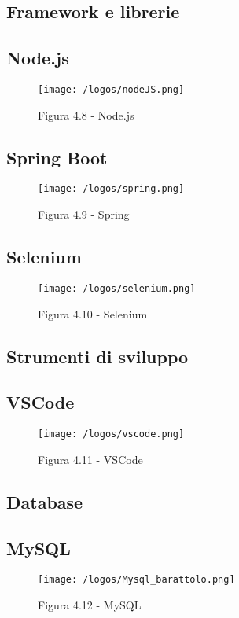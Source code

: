 \subsection{Framework e librerie}
\subsection*{Node.js}
\begin{figure}[H] 
    \centering 
    \texttt{[image: /logos/nodeJS.png]} 
    \caption{Figura 4.8 - Node.js}
\end{figure}


\subsection*{Spring Boot}
\begin{figure}[H] 
    \centering 
    \texttt{[image: /logos/spring.png]} 
    \caption{Figura 4.9 - Spring}
\end{figure}


\subsection*{Selenium}
\begin{figure}[H] 
    \centering 
    \texttt{[image: /logos/selenium.png]} 
    \caption{Figura 4.10 - Selenium}
\end{figure}


\subsection{Strumenti di sviluppo}
\subsection*{VSCode}
\begin{figure}[H] 
    \centering 
    \texttt{[image: /logos/vscode.png]} 
    \caption{Figura 4.11 - VSCode}
\end{figure}


\subsection{Database}
\subsection*{MySQL}
\begin{figure}[H] 
    \centering 
    \texttt{[image: /logos/Mysql\_barattolo.png]} 
    \caption{Figura 4.12 - MySQL}
\end{figure}


